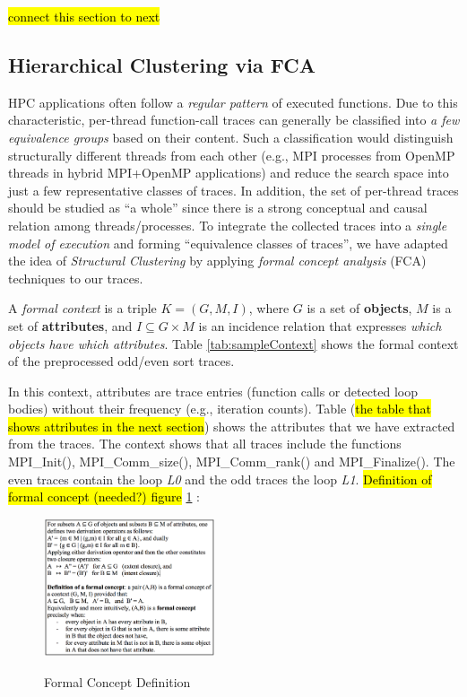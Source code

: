 \hl{connect this section to next}


\subsection{Hierarchical Clustering via FCA}
HPC applications often follow a \textit{regular pattern} of executed functions.
%
Due to this characteristic, per-thread function-call traces can generally be classified into \textit{a few equivalence groups} based on their content.
%
Such a classification would distinguish structurally different threads from each other (e.g., MPI processes from OpenMP threads in hybrid MPI+OpenMP applications) and reduce the search space into just a few representative classes of traces.
%
In addition, the set of per-thread traces should be studied as ``a whole'' since there is a strong conceptual and causal relation among threads/processes.
%
To integrate the collected traces into a \textit{single model of execution} and forming ``equivalence classes of traces'', we have adapted the idea of \textit{Structural Clustering} \cite{weberStructural} by applying \textit{formal concept analysis} (FCA) \cite{clbook} techniques to our traces.
%

A \textit{formal context} is a triple $K = (G, M, I)$, where $G$ is a set of \textbf{objects}, $M$ is a set of \textbf{attributes}, and $I \subseteq G \times M$ is an incidence relation that expresses \textit{which objects have which attributes}. Table \ref{tab:sampleContext} shows the formal context of the preprocessed odd/even sort traces.

%
In this context, attributes are trace entries (function calls or detected loop bodies) without their frequency (e.g., iteration counts). Table (\hl{the table that shows attributes in the next section}) shows the attributes that we have extracted from the traces. The context shows that all traces include the functions MPI\_Init(), MPI\_Comm\_size(), MPI\_Comm\_rank() and MPI\_Finalize(). The even traces contain the loop \textit{L0} and the odd traces the loop \textit{L1}.
%
\hl{Definition of formal concept (needed?) figure }\ref{fig:formalConceptDefinition} :

\begin{figure}[]
\centering
\caption{Formal Concept Definition}
\includegraphics[width=0.45\textwidth]{figs/formalConceptDefinition.png}
\label{fig:formalConceptDefinition}
\end{figure}

